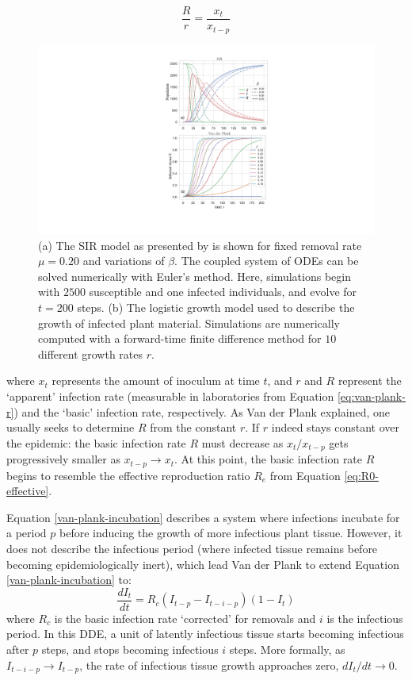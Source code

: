 \begin{equation}
    \frac{R}{r} = \frac{x_t}{x_{t-p}}
\end{equation}
\begin{figure}
     \centering
     \includegraphics[scale=0.55]{chapter2/figures/SIR-vs-Plank.pdf}
     \caption{(a) The SIR model as presented by \cite{kermack-model} is shown for fixed removal rate $\mu = 0.20$ and variations of $\beta$. 
                  The coupled system of ODEs can be solved numerically with Euler's method. Here, simulations begin with 
                  $2500$ susceptible and one infected individuals, and evolve for $t=200$ steps.
                  (b) The logistic growth model \cite{van2013plant} used to describe the growth of infected plant material.
                  Simulations are numerically computed with a forward-time finite difference method for $10$ different growth rates $r$.
       } 
     \label{fig:SIR-vs-plank}
 \end{figure}
where $x_t$ represents the amount of inoculum at time $t$, and $r$ and $R$ represent the `apparent' infection rate (measurable in laboratories from Equation \ref{eq:van-plank-r})
and the `basic' infection rate, respectively. 
As Van der Plank explained, one usually seeks
to determine $R$ from the constant $r$. If $r$ indeed stays constant over the epidemic:
the basic infection rate $R$ must decrease as $x_t/x_{t-p}$ gets progressively smaller as $x_{t-p}\rightarrow x_t $.
At this point, the basic infection rate $R$ begins to resemble the effective reproduction ratio $R_e$
from Equation \ref{eq:R0-effective}. 

Equation \ref{van-plank-incubation} describes a system where
infections incubate for a period $p$ before inducing the growth of more infectious plant tissue.
However, it does not describe the infectious period (where infected tissue remains before becoming epidemiologically inert),
which lead Van der Plank to extend Equation \ref{van-plank-incubation} to:
\begin{equation}
\label{van-plank-infectious-p}
    \frac{dI_t}{dt} = R_c(I_{t-p} - I_{t-i-p})(1 - I_{t})
\end{equation}
where $R_c$ is the basic infection rate `corrected' for removals and $i$ is the infectious period.
In this DDE, a unit of latently infectious tissue starts becoming infectious after $p$ steps, and stops becoming infectious $i$ steps.
More formally, as $I_{t-i-p} \rightarrow I_{t-p}$, the rate of infectious tissue growth approaches zero, $dI_t/dt \rightarrow 0$.


